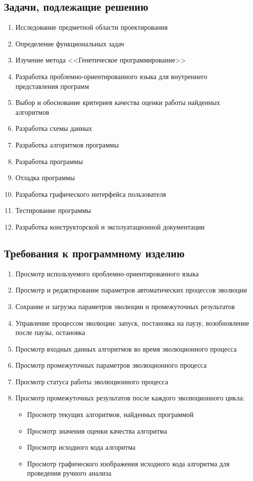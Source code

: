 \documentclass[russian,utf8,emptystyle]{eskdtext}
\begin{document}
\subsection{Задачи, подлежащие решению}
\begin{enumerate}
\item Исследование предметной области проектирования
\item Определение функциональных задач
\item Изучение метода <<Генетическое программирование>>
\item Разработка проблемно-ориентированного языка для внутреннего представления программ
\item Выбор и обоснование критериев качества оценки работы найденных алгоритмов
\item Разработка схемы данных
\item Разработка алгоритмов программы
\item Разработка программы
\item Отладка программы
\item Разработка графического интерфейса пользователя
\item Тестирование программы
\item Разработка конструкторской и эксплуатационной документации
\end{enumerate}

\subsection{Требования к программному изделию}
\begin{enumerate}
\item Просмотр используемого проблемно-ориентированного языка
\item Просмотр и редактирование параметров автоматических процессов эволюции
\item Сохрание и загрузка параметров эволюции и промежуточных результатов
\item Управление процессом эволюции: запуск, постановка на паузу, возобновление после паузы, остановка
\item Просмотр входных данных алгоритмов во время эволюционного процесса
\item Просмотр промежуточных параметров эволюционного процесса
\item Просмотр статуса работы эволюционного процесса
\item Просмотр промежуточных результатов после каждого эволюционного цикла:
\begin{itemize}
\item Просмотр текущих алгоритмов, найденных программой
\item Просмотр значения оценки качества алгоритма
\item Просмотр исходного кода алгоритма
\item Просмотр графического изображения исходного кода алгоритма для проведения ручного анализа
\end{itemize}
\end{enumerate}
\end{document}
